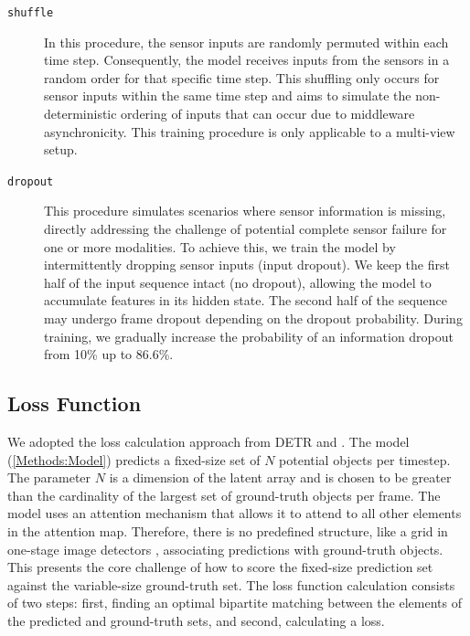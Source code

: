 \begin{description}
    \item[\texttt{shuffle}] In this procedure, the sensor inputs are randomly permuted within each time step. Consequently, the model receives inputs from the sensors in a random order for that specific time step. This shuffling only occurs for sensor inputs within the same time step and aims to simulate the non-deterministic ordering of inputs that can occur due to middleware asynchronicity. This training procedure is only applicable to a multi-view setup.

    \item[\texttt{dropout}] This procedure simulates scenarios where sensor information is missing, directly addressing the challenge of potential complete sensor failure for one or more modalities. To achieve this, we train the model by intermittently dropping sensor inputs (input dropout). We keep the first half of the input sequence intact (no dropout), allowing the model to accumulate features in its hidden state. The second half of the sequence may undergo frame dropout depending on the dropout probability. During training, we gradually increase the probability of an information dropout from 10\% up to 86.6\%.
\end{description}


\subsection{Loss Function} \label{Methods:LossFunction}

We adopted the loss calculation approach from DETR \cite{carionEndtoEndObjectDetection2020} and \cite{stewartEndtoendPeopleDetection2015}. The model (\ref{Methods:Model}) predicts a fixed-size set of $N$ potential objects per timestep. The parameter $N$ is a dimension of the latent array and is chosen to be greater than the cardinality of the largest set of ground-truth objects per frame. The model uses an attention mechanism that allows it to attend to all other elements in the attention map. Therefore, there is no predefined structure, like a grid in one-stage image detectors \cite{redmonYouOnlyLook2016}, associating predictions with ground-truth objects. This presents the core challenge of how to score the fixed-size prediction set against the variable-size ground-truth set. The loss function calculation consists of two steps: first, finding an optimal bipartite matching between the elements of the predicted and ground-truth sets, and second, calculating a loss.

